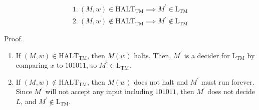 \documentclass[11pt,addpoints,answers]{exam}
\newcommand{\1}{\mathbf{1}}
\begin{document}
\begin{align*}
    1. \ (M, w) \in \text{HALT}_\text{TM} \implies M^\prime \in \text{L}_\text{TM} \\
    2. \ (M, w) \notin \text{HALT}_\text{TM} \implies M^\prime \notin \text{L}_\text{TM}
\end{align*}

\noindent Proof.

\begin{enumerate}
    \item If $(M, w) \in \text{HALT}_\text{TM}$, then $M(w)$ halts. Then, $M^\prime$ is a decider for L$_\text{TM}$ by comparing $x$ to $101011$, so $M^\prime \in \text{L}_\text{TM}$.
    \item If $(M, w) \notin \text{HALT}_\text{TM}$, then $M(w)$ does not halt and $M^\prime$ must run forever. Since $M^\prime$ will not accept any input including $101011$, then $M^\prime$ does not decide $L$, and $M^\prime \notin \text{L}_\text{TM}$.
\end{enumerate}
\end{document}
